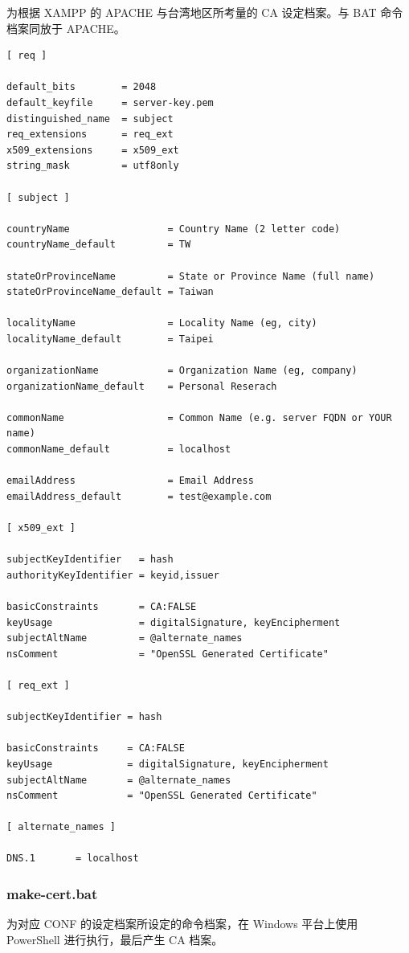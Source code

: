 为根据 XAMPP 的 APACHE 与台湾地区所考量的 CA 设定档案。与 BAT 命令档案同放于 APACHE。

\begin{Verbatim}
[ req ]

default_bits        = 2048
default_keyfile     = server-key.pem
distinguished_name  = subject
req_extensions      = req_ext
x509_extensions     = x509_ext
string_mask         = utf8only

[ subject ]

countryName                 = Country Name (2 letter code)
countryName_default         = TW

stateOrProvinceName         = State or Province Name (full name)
stateOrProvinceName_default = Taiwan

localityName                = Locality Name (eg, city)
localityName_default        = Taipei

organizationName            = Organization Name (eg, company)
organizationName_default    = Personal Reserach

commonName                  = Common Name (e.g. server FQDN or YOUR name)
commonName_default          = localhost

emailAddress                = Email Address
emailAddress_default        = test@example.com

[ x509_ext ]

subjectKeyIdentifier   = hash
authorityKeyIdentifier = keyid,issuer

basicConstraints       = CA:FALSE
keyUsage               = digitalSignature, keyEncipherment
subjectAltName         = @alternate_names
nsComment              = "OpenSSL Generated Certificate"

[ req_ext ]

subjectKeyIdentifier = hash

basicConstraints     = CA:FALSE
keyUsage             = digitalSignature, keyEncipherment
subjectAltName       = @alternate_names
nsComment            = "OpenSSL Generated Certificate"

[ alternate_names ]

DNS.1       = localhost
\end{Verbatim}

\subsubsection{make-cert.bat}

为对应 CONF 的设定档案所设定的命令档案，在 Windows 平台上使用 PowerShell 进行执行，最后产生 CA 档案。

